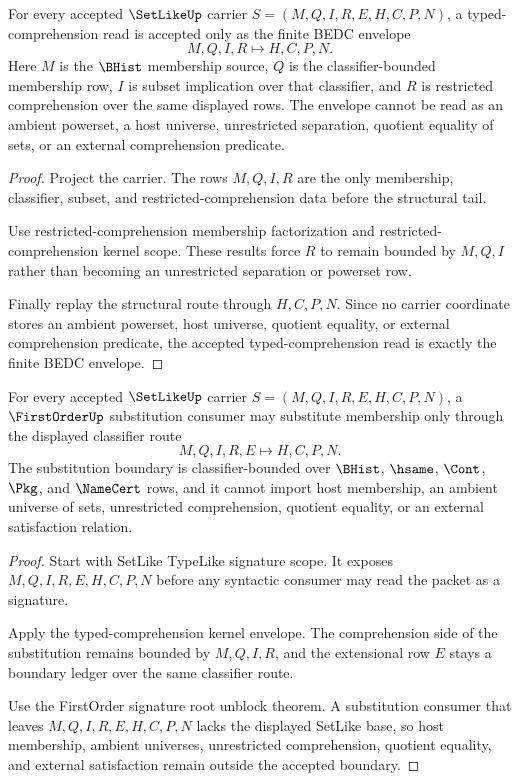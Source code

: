 \begin{theorem}
\label{thm:setlike-typed-comprehension-kernel-envelope}
For every accepted $\SetLikeUp$ carrier $S=(M,Q,I,R,E,H,C,P,N)$, a typed-comprehension read is accepted only as the finite BEDC envelope
$$
M,Q,I,R \longmapsto H,C,P,N .
$$
Here $M$ is the $\BHist$ membership source, $Q$ is the classifier-bounded membership row, $I$ is subset implication over that classifier, and $R$ is restricted comprehension over the same displayed rows. The envelope cannot be read as an ambient powerset, a host universe, unrestricted separation, quotient equality of sets, or an external comprehension predicate.
\end{theorem}
\begin{proof}
Project the carrier. The rows $M,Q,I,R$ are the only membership, classifier, subset, and restricted-comprehension data before the structural tail.

Use restricted-comprehension membership factorization and restricted-comprehension kernel scope. These results force $R$ to remain bounded by $M,Q,I$ rather than becoming an unrestricted separation or powerset row.

Finally replay the structural route through $H,C,P,N$. Since no carrier coordinate stores an ambient powerset, host universe, quotient equality, or external comprehension predicate, the accepted typed-comprehension read is exactly the finite BEDC envelope.
\end{proof}

\begin{theorem}
\label{thm:setlike-firstorder-membership-substitution-boundary}
For every accepted $\SetLikeUp$ carrier $S=(M,Q,I,R,E,H,C,P,N)$, a $\FirstOrderUp$ substitution consumer may substitute membership only through the displayed classifier route
$$
M,Q,I,R,E \longmapsto H,C,P,N .
$$
The substitution boundary is classifier-bounded over $\BHist$, $\hsame$, $\Cont$, $\Pkg$, and $\NameCert$ rows, and it cannot import host membership, an ambient universe of sets, unrestricted comprehension, quotient equality, or an external satisfaction relation.
\end{theorem}
\begin{proof}
Start with SetLike TypeLike signature scope. It exposes $M,Q,I,R,E,H,C,P,N$ before any syntactic consumer may read the packet as a signature.

Apply the typed-comprehension kernel envelope. The comprehension side of the substitution remains bounded by $M,Q,I,R$, and the extensional row $E$ stays a boundary ledger over the same classifier route.

Use the FirstOrder signature root unblock theorem. A substitution consumer that leaves $M,Q,I,R,E,H,C,P,N$ lacks the displayed SetLike base, so host membership, ambient universes, unrestricted comprehension, quotient equality, and external satisfaction remain outside the accepted boundary.
\end{proof}

